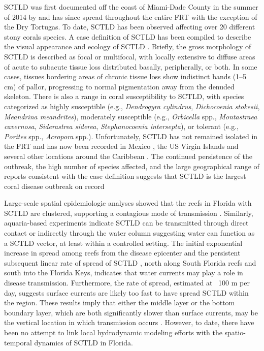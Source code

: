 SCTLD was first documented off the coast of Miami-Dade County in the summer of 2014 by \cite{precht2016unprecedented} and has since spread throughout the entire FRT with the exception of the Dry Tortugas. To date, SCTLD has been observed affecting over 20 different stony corals species. A case definition of SCTLD has been compiled to describe the visual appearance and ecology of SCTLD \citep{noaa2018}. Briefly, the gross morphology of SCTLD is described as focal or multifocal, with locally extensive to diffuse areas of acute to subacute tissue loss distributed basally, peripherally, or both. In some cases, tissues bordering areas of chronic tissue loss show indistinct bands (1–5 cm) of pallor, progressing to normal pigmentation away from the denuded skeleton. There is also a range in coral susceptibility to SCTLD, with species categorized as highly susceptible (e.g., \textit{Dendrogyra cylindrus}, \textit{Dichocoenia stokesii}, \textit{Meandrina meandrites}), moderately susceptible (e.g., \textit{Orbicella} spp., \textit{Montastraea cavernosa}, \textit{Siderastrea siderea}, \textit{Stephanocoenia intersepta}), or tolerant (e.g., \textit{Porites} spp., \textit{Acropora} spp.). Unfortunately, SCTLD has not remained isolated in the FRT and has now been recorded in Mexico \citep{alvarez2019rapid}, the US Virgin Islands \citep{blondeau2020coral} and several other locations around the Caribbean \citep{kramer2019map}. The continued persistence of the outbreak, the high number of species affected, and the large geographical range of reports consistent with the case definition suggests that SCTLD is the largest coral disease outbreak on record 

Large-scale spatial epidemiologic analyses showed that the reefs in Florida with SCTLD are clustered, supporting a contagious mode of transmission \citep{muller2020spatial}. Similarly, aquaria-based experiments indicate SCTLD can be transmitted through direct contact or indirectly through the water column \citep{aeby2019pathogenesis} suggesting water can function as a SCTLD vector, at least within a controlled setting. The initial exponential increase in spread among reefs from the disease epicenter \citep{precht2016unprecedented} and the persistent subsequent linear rate of spread of SCTLD \citep{muller2020spatial}, north along South Florida reefs and south into the Florida Keys, indicates that water currents may play a role in disease transmission. Furthermore, the rate of spread, estimated at ~100 m per day, suggests surface currents are likely too fast to have spread SCTLD within the region. These results imply that either the middle layer or the bottom boundary layer, which are both significantly slower than surface currents, may be the vertical location in which transmission occurs \citep{muller2020spatial}. However, to date, there have been no attempt to link local hydrodynamic modeling efforts with the spatio-temporal dynamics of SCTLD in Florida.

